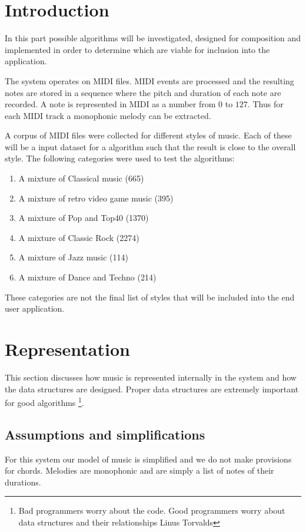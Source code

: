 

\chapter{Introduction}
In this part possible algorithms will be investigated, designed for composition and implemented in order to determine which are viable for inclusion into the application.

The system operates on MIDI files. MIDI events are processed and the resulting notes are stored in a sequence where the pitch and duration of each note are recorded. A note is represented in MIDI as a number from $0$ to $127$.
Thus for each MIDI track a monophonic melody can be extracted.

A corpus of MIDI files were collected for different styles of music. Each of these will be a input dataset for a algorithm such that the result is close to the overall style.
The following categories were used to test the algorithms:
\begin{enumerate}
\item A mixture of Classical music (665)
\item A mixture of retro video game music (395)
\item A mixture of Pop and Top40 (1370)
\item A mixture of Classic Rock (2274)
\item A mixture of Jazz music (114)
\item A mixture of Dance and Techno (214)
\end{enumerate}

These categories are not the final list of styles that will be included into the end user application.


\chapter{Representation}
This section discusses how music is represented internally in the system and how the data structures are designed. 
Proper data structures are extremely important for good algorithms \footnote{Bad programmers worry about the code. Good programmers worry about data structures and their relationships \mytilde Linus Torvalds}.

\section{Assumptions and simplifications}
For this system our model of music is simplified and we do not make provisions for chords. Melodies are monophonic and are simply a list of notes of their durations.

